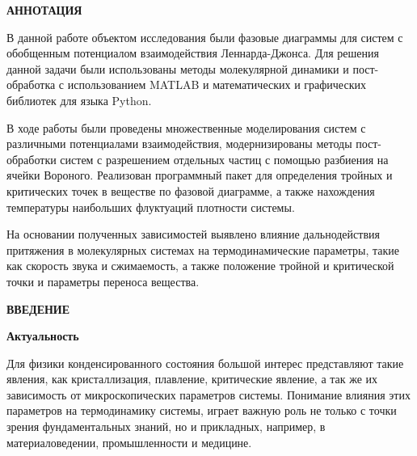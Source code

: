 
\newpage
\begin{center}
\textbf{АННОТАЦИЯ}
\end{center}

В данной работе объектом исследования были фазовые диаграммы для систем с обобщенным потенциалом взаимодействия Леннарда-Джонса. Для решения данной задачи были использованы методы молекулярной динамики и пост-обработка с использованием MATLAB и математических и графических библиотек для языка Python.

 В ходе работы были проведены множественные моделирования систем с различными потенциалами взаимодействия, модернизированы методы пост-обработки систем с разрешением отдельных частиц с помощью разбиения на ячейки Вороного. Реализован программный пакет для определения тройных и критических точек в веществе по фазовой диаграмме, а также нахождения температуры наибольших флуктуаций плотности системы.
 
 На основании полученных зависимостей выявлено влияние дальнодействия притяжения в молекулярных системах на термодинамические параметры, такие как скорость звука и сжимаемость, а также положение тройной и критической точки и параметры переноса вещества. 


\onehalfspacing
\setcounter{page}{2}
\renewcommand{\contentsname}{\centerline{\Large{Cодержание}}}
\tableofcontents
{}
\renewcommand{\contentsname}{\centerline{\Large{Cодержание}}}

\newpage
\begin{center}
\textbf{ВВЕДЕНИЕ}
\end{center}



\textbf{Актуальность}

Для физики конденсированного состояния большой интерес представляют такие явления, как кристаллизация, плавление, критические явление, а так же их зависимость от микроскопических параметров системы. Понимание влияния этих параметров на термодинамику системы, играет важную роль не только с точки зрения фундаментальных знаний, но и прикладных, например, в материаловедении, промышленности и медицине.

